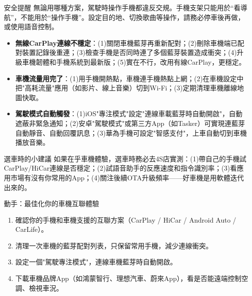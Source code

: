 \begin{tcbwarn}{安全提醒}
無論用哪種方案，駕駛時操作手機都違反交規。手機支架只能用於“看導航”，不能用於“操作手機”。設定目的地、切換歌曲等操作，請務必停車後再做，或使用語音控制。

\end{tcbwarn}


\begin{itemize}
  \item \textbf{無線CarPlay連線不穩定}：(1)關閉車機藍芽再重新配對；(2)刪除車機端已配對裝置記錄後重連；(3)檢查手機是否同時連了多個藍芽裝置造成衝突；(4)升級車機韌體和手機系統到最新版；(5)實在不行，改用有線CarPlay，更穩定。
  \item \textbf{車機流量用完了}：(1)用手機開熱點，車機連手機熱點上網；(2)在車機設定中把"高耗流量"應用（如影片、線上音樂）切到Wi-Fi；(3)定期清理車機離線地圖快取。
  \item \textbf{駕駛模式自動觸發}：(1)iOS"專注模式"設定"連線車載藍芽時自動開啟"，自動遮蔽非緊急通知；(2)安卓"駕駛模式"或第三方App（如Tasker）可實現連藍芽自動靜音、自動回覆訊息；(3)華為手機可設定"智感支付"，上車自動切到車機播放音樂。
\end{itemize}

\begin{tcbinfo}{選車時的小建議}
如果在乎車機體驗，選車時務必去4S店實測：(1)帶自己的手機試CarPlay/HiCar連線是否穩定；(2)試語音助手的反應速度和指令識別率；(3)看應用市場有沒有你常用的App；(4)關注後續OTA升級頻率——好車機是用軟體迭代出來的。

\end{tcbinfo}

\begin{tcbpractice}{動手：最佳化你的車機互聯體驗}
\begin{enumerate}
  \item 確認你的手機和車機支援的互聯方案（CarPlay / HiCar / Android Auto / CarLife）。
  \item 清理一次車機的藍芽配對列表，只保留常用手機，減少連線衝突。
  \item 設定一個"駕駛專注模式"，連線車機藍芽時自動開啟。
  \item 下載車機品牌App（如鴻蒙智行、理想汽車、蔚來App），看是否能遠端控制空調、檢視車況。
\end{enumerate}

\end{tcbpractice}

